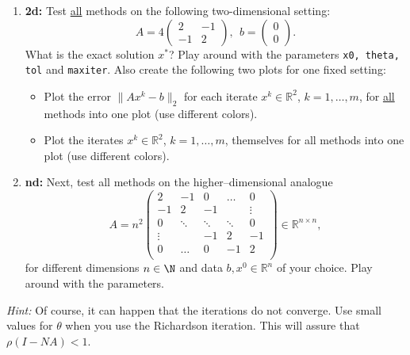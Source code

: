 \begin{enumerate}
		\item \textbf{2d:} Test \underline{all} methods on the following two-dimensional setting:
		$$A = 4 \begin{pmatrix}
		2&-1\\ -1&2
		\end{pmatrix}, ~~b = \begin{pmatrix}
		0\\0
		\end{pmatrix}.$$ 
		What is the exact solution $x^*$? Play around with the parameters \texttt{x0, theta, tol} and \texttt{maxiter}.
		Also create the following two plots for one fixed setting:
		\begin{itemize}
			\item Plot the error $\|Ax^k - b\|_2$  for each iterate $x^k \in \mathbb{R}^2$, $k=1,\dots,m$, for \underline{all} methods into one plot (use different colors).
			\item Plot the iterates $x^k \in \mathbb{R}^2$, $k=1,\dots,m$, themselves for all methods into one plot (use different colors).
		\end{itemize}
		\item \textbf{nd:} Next, test all methods on the higher--dimensional analogue
		$$
		A = n^2 \left(\begin{array}{rrrrr}                                
		2 & -1  &0   & \hdots   & 0 \\                                               
		-1 &  2 & -1  &    &   \vdots \\                                               
		0&  \ddots &  \ddots &\ddots  &0  \\ 
		\vdots  &    &  -1 &  2 & -1  \\ 
		0 &   \hdots  & 0& -1  &  2 \\
		\end{array}\right)\in \mathbb{R}^{n \times n},$$
		for different dimensions $n\in\N$ and data $b,x^0 \in \mathbb{R}^n$ of your choice. Play around with the parameters.
	\end{enumerate}
	\textit{Hint: } Of course, it can happen that the iterations do not converge. Use small values for $\theta$ when you use the Richardson iteration. This will assure that $\rho(I-NA)<1$. 
